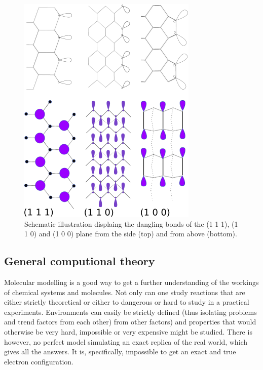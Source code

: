 \documentclass[12pt,a4paper]{article}
\begin{document}
\begin{figure} \captionsetup{width=.5\linewidth} \caption{Schematic illustration displaing the dangling bonds of the (1 1 1), (1 1 0) and (1 0 0) plane from the side (top) and from above (bottom).} \label{dangling_bonds}
\includegraphics[width=.5\linewidth]{pictures/dangling_bonds.png}
\end{figure} 

\subsection{General computional theory}
Molecular modelling is a good way to get a further understanding of the workings of chemical systems and molecules.  Not only can one study reactions that are either strictly theoretical or either to dangerous or hard to study in a practical experiments. Environments can easily be strictly defined (thus isolating problems and trend factors from each other) from other factors) and properties that would otherwise be very hard, impossible or very expensive might be studied. There is however, no perfect model simulating an exact replica of the real world, which gives all the answers. It is, specifically, impossible to get an exact and true electron configuration.
\end{document}
